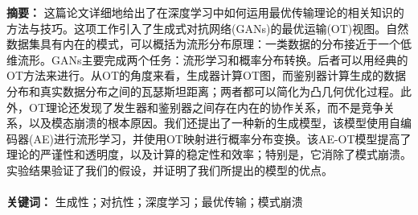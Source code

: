 \quad
\title{
}
\date{}
\maketitle
\thispagestyle{fancy}            %
\renewcommand{\headrulewidth}{1pt}      %

	\xiaosihao{}
	\noindent
	\textbf{摘要：}
	这篇论文详细地给出了在深度学习中如何运用最优传输理论的相关知识的方法与技巧。这项工作引入了生成式对抗网络(GANs)的最优运输(OT)视图。自然数据集具有内在的模式，可以概括为流形分布原理：一类数据的分布接近于一个低维流形。GANs主要完成两个任务：流形学习和概率分布转换。后者可以用经典的OT方法来进行。从OT的角度来看，生成器计算OT图，而鉴别器计算生成的数据分布和真实数据分布之间的瓦瑟斯坦距离；两者都可以简化为凸几何优化过程。此外，OT理论还发现了发生器和鉴别器之间存在内在的协作关系，而不是竞争关系，以及模态崩溃的根本原因。我们还提出了一种新的生成模型，该模型使用自编码器(AE)进行流形学习，并使用OT映射进行概率分布变换。该AE-OT模型提高了理论的严谨性和透明度，以及计算的稳定性和效率；特别是，它消除了模式崩溃。实验结果验证了我们的假设，并证明了我们所提出的模型的优点。
	\\
	\\
	\textbf{关键词：} 生成性；对抗性；深度学习；最优传输；模式崩溃
